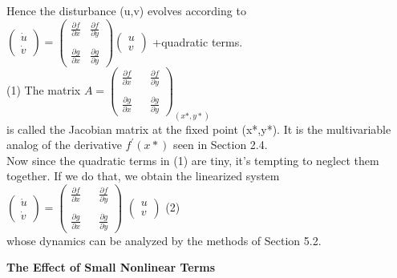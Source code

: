 \documentclass{article}
\newcommand\tab[1][1cm]{\hspace*{#1}}
\begin{document}
Hence the disturbance (u,v) evolves according to
\\ \tab ${
\begin{pmatrix}
\dot{u} \\
\dot{v}
\end{pmatrix}
= 
\begin{pmatrix}
\frac{\partial f}{\partial x} & \frac{\partial f}{\partial y} \\ \\
\frac{\partial g}{\partial x} & \frac{\partial g}{\partial y}
\end{pmatrix}
\begin{pmatrix}
u \\
v
\end{pmatrix}
}$
+quadratic terms. \\ \tab (1)
The matrix
$ {
A = 
\begin{pmatrix}
\frac{\partial f}{\partial x} && \frac{\partial f}{\partial y} \\ \\ 
\frac{\partial g}{\partial x} && \frac{\partial g}{\partial y}
\end{pmatrix}_{(x*,y*)}}$
\\
is called the Jacobian matrix at the fixed point (x*,y*). It is the multivariable analog of the derivative $f^{'}(x*)$ seen in Section 2.4. \\ \tab
Now since the quadratic terms in (1) are tiny, it's tempting to neglect them together. If we do that, we obtain the linearized system \\
$ \begin{pmatrix}
\dot{u} \\
\dot{v}
\end{pmatrix} 
= 
\begin{pmatrix}
\frac{\partial f}{\partial x} && \frac{\partial f}{\partial y} \\ \\
\frac{\partial g}{\partial x} && \frac{\partial g}{\partial y}
\end{pmatrix}$
$
\begin{pmatrix}
u \\ v
\end{pmatrix}
$ \tab (2) \\
whose dynamics can be analyzed by the methods of Section 5.2.

\textbf {The Effect of Small Nonlinear Terms} \\ \tab
\end{document}
